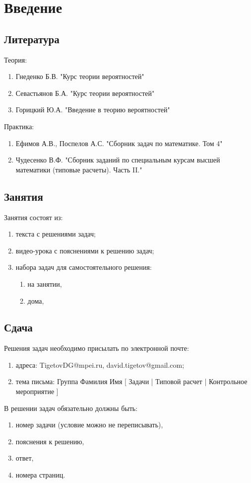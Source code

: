 \chapter{Введение}


\section*{Литература}

Теория:
\begin{enumerate}
    \item Гнеденко Б.В. "Курс теории вероятностей"
    \item Севастьянов Б.А. "Курс теории вероятностей"
    \item Горицкий Ю.А. "Введение в теорию вероятностей"
\end{enumerate}

Практика:
\begin{enumerate}
    \item Ефимов А.В., Поспелов А.С. "Сборник задач по математике. Том 4"
    \item Чудесенко В.Ф. "Сборник заданий по специальным курсам высшей математики (типовые расчеты). Часть II."
\end{enumerate}


\section*{Занятия}

Занятия состоят из:
\begin{enumerate}
    \item текста с решениями задач;
    \item видео-урока с пояснениями к решению задач;
    \item набора задач для самостоятельного решения:
    \begin{enumerate}
        \item на занятии,
        \item дома,
    \end{enumerate}
\end{enumerate}


\section*{Сдача}

Решения задач необходимо присылать по электронной почте:
\begin{enumerate}
    \item адреса: TigetovDG@mpei.ru, david.tigetov@gmail.com;
    \item тема письма: Группа Фамилия Имя [ Задачи | Типовой расчет | Контрольное мероприятие ]
\end{enumerate}

В решении задач обязательно должны быть:
\begin{enumerate}
    \item номер задачи (условие можно не переписывать),
    \item пояснения к решению,
    \item ответ,
    \item номера страниц.
\end{enumerate}